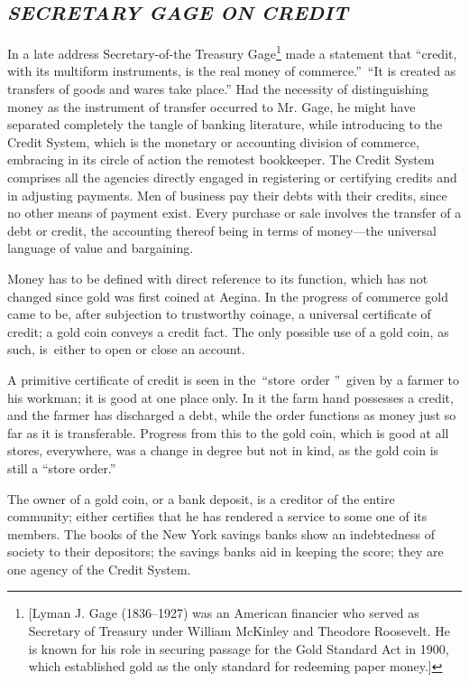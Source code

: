 \documentclass[twoside,symmetric,nobib,justified]{tufte-book}
\begin{document}
\enlargethispage{\baselineskip}

\hypertarget{secretary-gage-on-credit}{%
\subsection{\texorpdfstring{\emph{SECRETARY GAGE ON
CREDIT}}{SECRETARY GAGE ON CREDIT}}\label{secretary-gage-on-credit}}

In a late address Secretary-of-the Treasury Gage\footnote{{[}Lyman J.
  Gage (1836--1927) was an American financier who served as Secretary of
  Treasury under William McKinley and Theodore Roosevelt. He is known
  for his role in securing passage for the Gold Standard Act in 1900,
  which established gold as the only standard for redeeming paper
  money.{]}} made a statement that ``credit, with its multiform
instruments, is the real money of commerce.''~``It is created as
transfers of goods and wares take place.'' Had the necessity of
distinguishing money as the instrument of transfer occurred to Mr. Gage,
he might have separated completely the tangle of banking literature,
while introducing to the Credit System, which is the monetary or
accounting division of commerce, embracing in its circle of action the
remotest bookkeeper. The Credit System comprises all the agencies
directly engaged in registering or certifying credits and in adjusting
payments. Men of business pay their debts with their credits, since no
other means of payment exist. Every purchase or sale involves the
transfer of a debt or credit, the accounting thereof being in terms of
money---the universal language of value and bargaining.~

Money has to be defined with direct reference to its function, which has
not changed since gold was first coined at Aegina. In the progress of
commerce gold came to be, after subjection to trustworthy coinage, a
universal certificate of credit; a gold coin conveys a credit fact. The
only possible use of a gold coin, as such, is~either to open or close an
account.~

A primitive certificate of credit is seen in the~``store~order ''~given
by a farmer to his workman; it is good at one place only. In it the farm
hand possesses a credit, and the farmer has discharged a debt, while the
order functions as money just so far as it is transferable. Progress
from this to the gold coin, which is good at all stores, everywhere, was
a change in degree but not in kind, as the gold coin is still a ``store
order.''~

The owner of a gold coin, or a bank deposit, is a creditor of the entire
community; either certifies that he has rendered a service to some one
of its members. The books of the New York savings banks show an
indebtedness of society to their depositors; the savings banks aid in
keeping the score; they are one agency of the Credit System. ~
\end{document}
